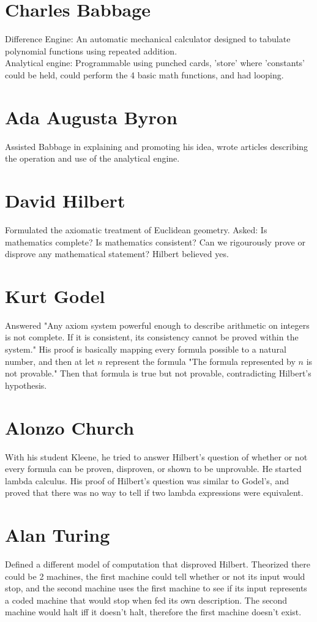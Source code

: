 \documentclass[10pt,letter]{article}
\begin{document}
\section*{Charles Babbage}
Difference Engine: An automatic mechanical calculator designed to tabulate polynomial functions using repeated addition. \\
Analytical engine: Programmable using punched cards, 'store' where 'constants' could be held, could perform the 4 basic math functions, and had looping. 

\section*{Ada Augusta Byron}
Assisted Babbage in explaining and promoting his idea, wrote articles describing the operation and use of the analytical engine. 

\section*{David Hilbert}
Formulated the axiomatic treatment of Euclidean geometry. Asked: Is mathematics complete? Is mathematics consistent? Can we rigourously prove or disprove any mathematical statement? Hilbert believed yes. 

\section*{Kurt Godel}
Answered "Any axiom system powerful enough to describe arithmetic on integers is not complete. If it is consistent, its consistency cannot be proved within the system." His proof is basically mapping every formula possible to a natural number, and then at let $n$ represent the formula "The formula represented by $n$ is not provable." Then that formula is true but not provable, contradicting Hilbert's hypothesis. 

\section*{Alonzo Church}
With his student Kleene, he tried to answer Hilbert's question of whether or not every formula can be proven, disproven, or shown to be unprovable. He started lambda calculus. His proof of Hilbert's question was similar to Godel's, and proved that there was no way to tell if two lambda expressions were equivalent. 

\section*{Alan Turing}
Defined a different model of computation that disproved Hilbert. Theorized there could be 2 machines, the first machine could tell whether or not its input would stop, and the second machine uses the first machine to see if its input represents a coded machine that would stop when fed its own description. The second machine would halt iff it doesn't halt, therefore the first machine doesn't exist. 
\end{document}
